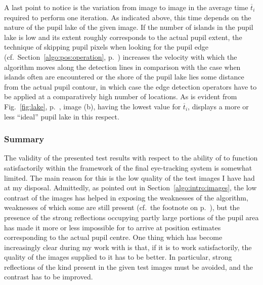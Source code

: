 A last point to notice is the variation from image to image in the
average time $\overline{t}_{i}$ required to perform one iteration.  As
indicated above, this time depends on the nature of the pupil lake of
the given image.  If the number of islands in the pupil lake is low
and its extent roughly corresponds to the actual pupil extent, the
technique of skipping pupil pixels when looking for the pupil edge
(cf.\ Section~\ref{algo:pos:operation},
p.~\pageref{pg:skiplakepixels}) increases the velocity with which the
algorithm moves along the detection lines in comparison with the case
when islands often are encountered or the shore of the pupil lake lies
some distance from the actual pupil contour, in which case the edge
detection operators have to be applied at a comparatively high number
of locations.  As is evident from Fig.~\ref{fig:lake},
p.~\pageref{fig:lake}, image (b), having the lowest value for
$\overline{t}_{i}$, displays a more or less ``ideal'' pupil lake in
this respect.

\subsubsection{Summary}

The validity of the presented test results with respect to the ability
of {\octopus} to function satisfactorily within the framework of the
final eye-tracking system is somewhat limited.  The main reason for
this is the low quality of the test images I have had at my disposal.
Admittedly, as pointed out in Section~\ref{algo:intro:images}, the low
contrast of the images has helped in exposing the weaknesses of the
algorithm, weaknesses of which some are still present (cf.\ the
footnote on p.~\pageref{pg:TEproblems}), but the presence of the
strong reflections occupying partly large portions of the pupil area
has made it more or less impossible for {\octopus} to arrive at
position estimates corresponding to the actual pupil centre.  One
thing which has become increasingly clear during my work with
{\octopus} is that, if it is to work satisfactorily, the quality of
the images supplied to it has to be better.  In particular, strong
reflections of the kind present in the given test images must be
avoided, and the contrast has to be improved.


